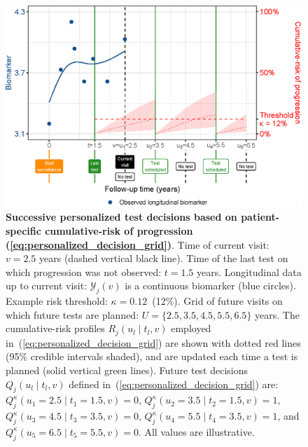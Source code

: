 \documentclass[AMA,STIX1COL]{WileyNJD-v2}
\begin{document}
\begin{figure}[!h]
\centerline{\includegraphics{figure3.eps}}
\caption{\textbf{Successive personalized test decisions based on patient-specific cumulative-risk of progression (\ref{eq:personalized_decision_grid})}. Time of current visit: $v=2.5$ years (dashed vertical black line). Time of the last test on which progression was not observed: $t=1.5$ years. Longitudinal data up to current visit: $\mathcal{Y}_j(v)$ is a continuous biomarker (blue circles). Example risk threshold: $\kappa=0.12$~(12\%). Grid of future visits on which future tests are planned: $U = \{2.5, 3.5, 4.5, 5.5, 6.5\}$ years. The cumulative-risk profiles $R_j(u_l \mid t_l, v)$ employed in~(\ref{eq:personalized_decision_grid}) are shown with dotted red lines (95\% credible intervals shaded), and are updated each time a test is planned (solid vertical green lines). Future test decisions $Q_j(u_l \mid t_l, v)$ defined in~(\ref{eq:personalized_decision_grid}) are: $Q_j^\kappa(u_1=2.5\mid t_1=1.5,v)=0$, $Q_j^\kappa(u_2=3.5\mid t_2=1.5,v)=1$, $Q_j^\kappa(u_3=4.5\mid t_3=3.5,v)=0$, $Q_j^\kappa(u_4=5.5\mid t_4=3.5,v)=1$, and $Q_j^\kappa(u_5=6.5\mid t_5=5.5,v)=0$. All values are illustrative.}
\label{fig:figure3}
\end{figure}
\end{document}
